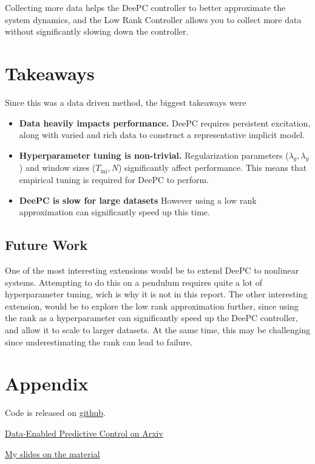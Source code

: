 \documentclass[11pt,a4paper]{article}
\begin{document}
Collecting more data helps the DeePC controller to better approximate the system dynamics, and the Low Rank Controller allows you to collect more data without significantly slowing down the controller.


\section{Takeaways}
Since this was a data driven method, the biggest takeaways were 


\begin{itemize}
    \item \textbf{Data heavily impacts performance.}  
    DeePC requires persistent excitation, along with varied and rich data to construct a representative implicit model.

    \item \textbf{Hyperparameter tuning is non-trivial.}  
    Regularization parameters (\( \lambda_g, \lambda_y \)) and window sizes (\(T_{\text{ini}}, N\)) significantly affect performance. This means that empirical tuning is required for DeePC to perform.

    \item \textbf{DeePC is slow for large datasets} However using a low rank approximation can significantly speed up this time.
\end{itemize}

\subsection{Future Work}
One of the most interesting extensions would be to extend DeePC to nonlinear systems. Attempting to do this on a pendulum requires quite a lot of hyperparameter tuning, wich is why it is not in this report.
The other interesting extension, would be to explore the low rank approximation further, since using the rank as a hyperparameter can significantly speed up the DeePC controller, and allow it to scale to larger datasets. At the same time, this may be challenging since underestimating the rank can lead to failure.
\section{Appendix}
Code is released on \href{https://github.com/Sanjit1/DeePC}{github}. 


\href{https://arxiv.org/abs/1811.05890#}{Data-Enabled Predictive Control on Arxiv}

\href{https://docs.google.com/presentation/d/1G0WMO9AojQ1DTrTkCCZOjw6U850QCCY_Jp0nHHJWcT4/edit?usp=sharing}{My slides on the material}
\end{document}
